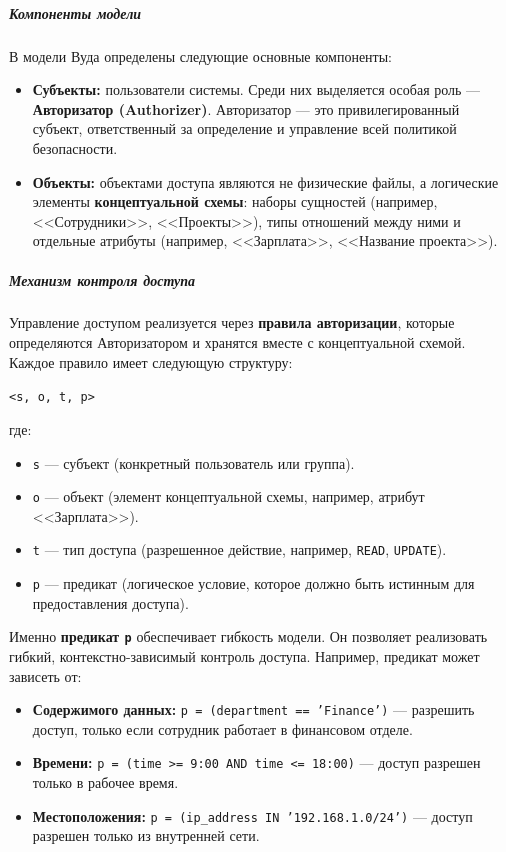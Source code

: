 \subparagraph{Компоненты модели}
В модели Вуда определены следующие основные компоненты:
\begin{itemize}
	\item \textbf{Субъекты:} пользователи системы. Среди них выделяется особая роль --- \textbf{Авторизатор (Authorizer)}. Авторизатор --- это привилегированный субъект, ответственный за определение и управление всей политикой безопасности.
	\item \textbf{Объекты:} объектами доступа являются не физические файлы, а логические элементы \textbf{концептуальной схемы}: наборы сущностей (например, <<Сотрудники>>, <<Проекты>>), типы отношений между ними и отдельные атрибуты (например, <<Зарплата>>, <<Название проекта>>).
\end{itemize}

\subparagraph{Механизм контроля доступа}
Управление доступом реализуется через \textbf{правила авторизации}, которые определяются Авторизатором и хранятся вместе с концептуальной схемой. Каждое правило имеет следующую структуру:
\begin{center}
	\texttt{<s, o, t, p>}
\end{center}
где:
\begin{itemize}
	\item \texttt{s} --- субъект (конкретный пользователь или группа).
	\item \texttt{o} --- объект (элемент концептуальной схемы, например, атрибут <<Зарплата>>).
	\item \texttt{t} --- тип доступа (разрешенное действие, например, \texttt{READ}, \texttt{UPDATE}).
	\item \texttt{p} --- предикат (логическое условие, которое должно быть истинным для предоставления доступа).
\end{itemize}

Именно \textbf{предикат \texttt{p}} обеспечивает гибкость модели. Он позволяет реализовать гибкий, контекстно-зависимый контроль доступа. Например, предикат может зависеть от:
\begin{itemize}
	\item \textbf{Содержимого данных:} \texttt{p = (department == 'Finance')} --- разрешить доступ, только если сотрудник работает в финансовом отделе.
	\item \textbf{Времени:} \texttt{p = (time >= 9:00 AND time <= 18:00)} --- доступ разрешен только в рабочее время.
	\item \textbf{Местоположения:} \texttt{p = (ip\_address IN '192.168.1.0/24')} --- доступ разрешен только из внутренней сети.
\end{itemize}

